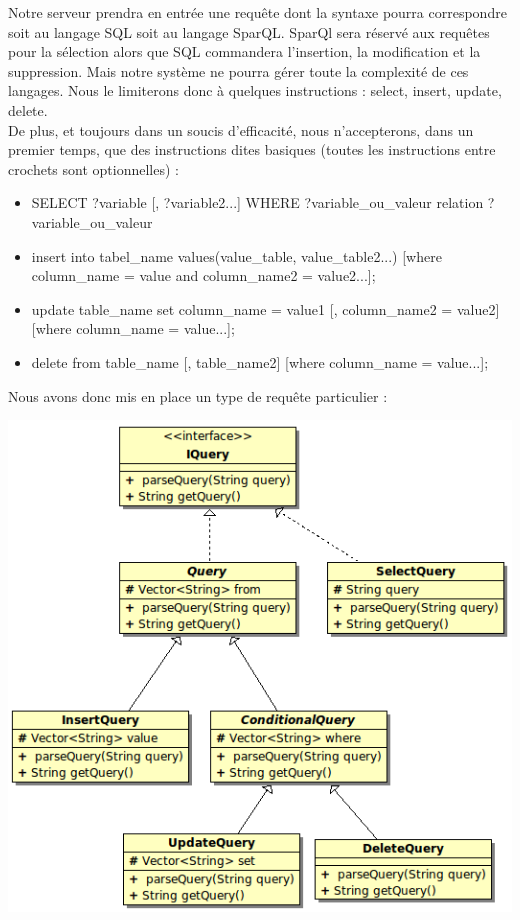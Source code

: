 \documentclass[12pt]{article}
\begin{document}
	Notre serveur prendra en entrée une requête dont la syntaxe pourra correspondre soit au langage SQL soit au langage SparQL. SparQl sera réservé aux requêtes pour la sélection alors que SQL commandera l'insertion, la modification et la suppression. Mais notre système ne pourra gérer toute la complexité de ces langages. Nous le limiterons donc à quelques instructions : select, insert, update, delete.\\
	De plus, et toujours dans un soucis d'efficacité, nous n'accepterons, dans un premier temps, que des instructions dites basiques (toutes les instructions entre crochets sont optionnelles) :\\
	\begin{itemize}
	\item SELECT ?variable [, ?variable2...] WHERE {?variable\_ou\_valeur relation ?variable\_ou\_valeur}\\
	\item insert into tabel\_name values(value\_table, value\_table2...) [where column\_name = value and column\_name2 = value2...];\\
	\item update table\_name set column\_name = value1 [, column\_name2  = value2] [where column\_name = value...];\\
	\item delete from table\_name [, table\_name2] [where column\_name = value...];\\
	\end{itemize}
	Nous avons donc mis en place un type de requête particulier :\\

\begin{center}
	\includegraphics[scale=0.70]{images/QueryHierarchie.png}
\end{center}
\end{document}
